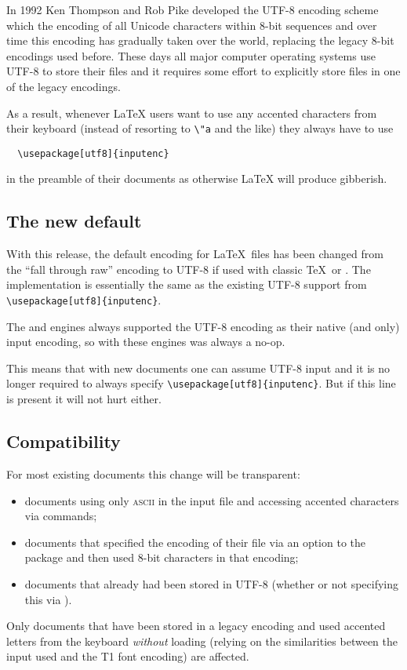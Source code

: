\documentclass{ltnews}
\providecommand\acro[1]{\textsc{#1}}
\begin{document}
In 1992 Ken Thompson and Rob Pike developed the UTF-8 encoding scheme
which the encoding of all Unicode characters within 8-bit sequences
and over time this encoding has gradually taken over the world,
replacing the legacy 8-bit encodings used before. These days all major
computer operating systems use UTF-8 to store their files and it
requires some effort to explicitly store files in one of the legacy
encodings.

As a result, whenever \LaTeX{} users want to use any accented
characters from their keyboard (instead of resorting to \verb=\"a= and
the like) they always have to use
\begin{verbatim}
  \usepackage[utf8]{inputenc}
\end{verbatim}
in the preamble of their documents as otherwise \LaTeX{} will produce
gibberish.

\subsection*{The new default}

With this release, the default encoding for \LaTeX\ files has been
changed from the ``fall through raw'' encoding to UTF-8 if used with
classic \TeX\ or . The implementation is essentially
the same as the existing UTF-8 support from
\verb|\usepackage[utf8]{inputenc}|.  

The  and  engines always supported the
UTF-8 encoding as their native (and only) input encoding, so with
these engines  was always a no-op.

This means that with new documents one can assume UTF-8 input and it
is no longer required to always specify
\verb|\usepackage[utf8]{inputenc}|. But if this line is present it
will not hurt either.


\subsection*{Compatibility}

For most existing documents this change will be transparent:
\begin{itemize}
\item documents using only \acro{ascii} in the input file and
  accessing accented characters via commands;
\item documents that specified the encoding of their file via an
  option to the  package and then used 8-bit
  characters in that encoding;
\item documents that already had been stored in UTF-8 (whether or not
  specifying this via ).
\end{itemize}
Only documents that have been stored in a legacy encoding and used
accented letters from the keyboard \emph{without} loading
 (relying on the similarities between the input used
and the T1 font encoding) are affected.
\end{document}
